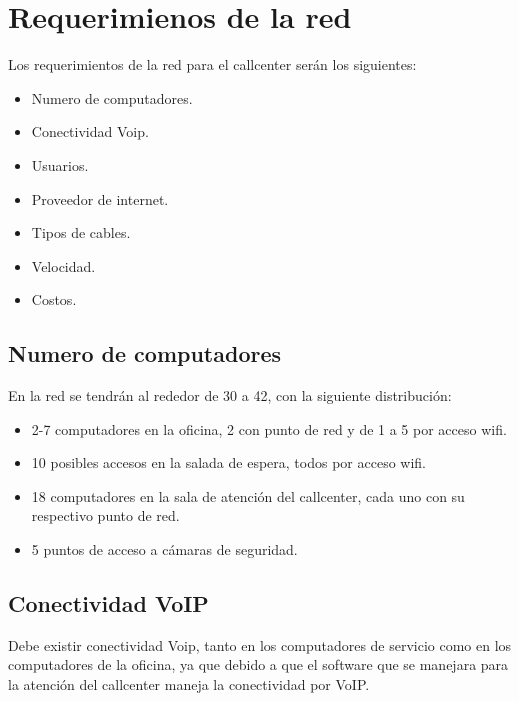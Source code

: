 \documentclass[12pt]{article}
\begin{document}
\pagebreak
\section{\textbf{Requerimienos de la red}}
Los requerimientos de la red para el callcenter serán los siguientes:
\begin{itemize}
\item
Numero de computadores.
\item
Conectividad Voip.
\item
Usuarios.
\item
Proveedor de internet.
\item
Tipos de cables.
\item
Velocidad.
\item
Costos.
\end{itemize}

\subsection{\textbf{Numero de computadores}}
En la red se tendrán al rededor de 30 a 42, con la siguiente distribución:
\begin{itemize}
\item
2-7 computadores en la oficina, 2 con punto de red y de 1 a 5 por acceso wifi.
\item
10 posibles accesos en la salada de espera, todos por acceso wifi.
\item
18 computadores en la sala de atención del callcenter, cada uno con su respectivo punto de red.
\item
5 puntos de acceso a cámaras de seguridad.
\end{itemize}

\subsection{\textbf{Conectividad VoIP}}
Debe existir conectividad Voip, tanto en los computadores de servicio como en los computadores de la oficina, ya que debido a que el software que se manejara para la atención del callcenter maneja la conectividad por VoIP.

\end{document}
